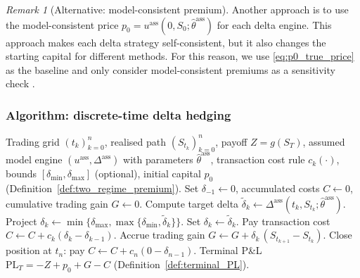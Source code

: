 \documentclass[12pt,a4paper]{article}
\theoremstyle{definition}
\theoremstyle{plain}
\theoremstyle{remark}
\newtheorem{remark}{Remark}[section]
\theoremstyle{plain}
\begin{document}
\begin{remark}[Alternative: model-consistent premium]
\label{rem:p0_model_consistent}
Another approach is to use the model-consistent price $p_0=u^{\mathrm{ass}}(0,S_0;\hat\theta^{\mathrm{ass}})$ for each delta engine.
This approach makes each delta strategy self-consistent, but it also changes the starting capital for different methods.
For this reason, we use \eqref{eq:p0_true_price} as the baseline and only consider model-consistent premiums as a sensitivity check \cite{ElKaroui1998Robustness}.
\end{remark}

\subsubsection{Algorithm: discrete-time delta hedging}
\label{subsubsec:delta_pseudocode}

\begin{algorithm}[H]
\caption{Discrete-time delta hedging under an assumed model}
\label{alg:delta_hedging}
\begin{algorithmic}[1]
\Require Trading grid $(t_k)_{k=0}^n$, realised path $(S_{t_k})_{k=0}^n$, payoff $Z=g(S_T)$,
assumed model engine $(u^{\mathrm{ass}},\Delta^{\mathrm{ass}})$ with parameters $\hat\theta^{\mathrm{ass}}$,
transaction cost rule $c_k(\cdot)$, bounds $[\delta_{\min},\delta_{\max}]$ (optional),
initial capital $p_0$ (Definition~\ref{def:two_regime_premium}).
\State Set $\delta_{-1}\gets 0$, accumulated costs $C\gets 0$, cumulative trading gain $G\gets 0$.
    \State Compute target delta $\tilde\delta_k \gets \Delta^{\mathrm{ass}}(t_k,S_{t_k};\hat\theta^{\mathrm{ass}})$.
        \State Project $\delta_k \gets \min\{\delta_{\max},\max\{\delta_{\min},\tilde\delta_k\}\}$.
    \Else
        \State Set $\delta_k \gets \tilde\delta_k$.
    \EndIf
    \State Pay transaction cost $C \gets C + c_k(\delta_k-\delta_{k-1})$.
    \State Accrue trading gain $G \gets G + \delta_k\,(S_{t_{k+1}}-S_{t_k})$.
\EndFor
\State Close position at $t_n$: pay $C \gets C + c_n(0-\delta_{n-1})$.
\State \Return Terminal P\&L $\mathrm{PL}_T = -Z + p_0 + G - C$ (Definition~\ref{def:terminal_PL}).
\end{algorithmic}
\end{algorithm}

\label{subsubsec:delta_robustness_map}
\end{document}
